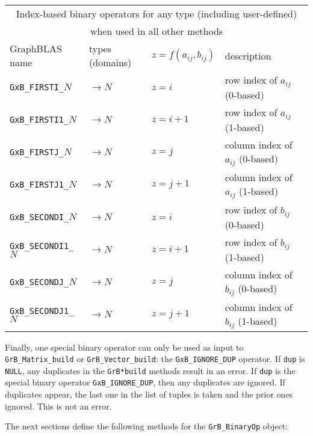 \documentclass[12pt]{article}
\begin{document}
\vspace{0.2in}
{\footnotesize
\begin{tabular}{|llll|}
\hline
\multicolumn{4}{|c|}{Index-based binary operators for any type (including user-defined)} \\
\multicolumn{4}{|c|}{when used in all other methods} \\
\hline
GraphBLAS name            & types (domains)   & $z=f(a_{ij},b_{ij})$      & description \\
\hline
\verb'GxB_FIRSTI_'$N$    & $ \rightarrow N$  & $z = i$       & row index of $a_{ij}$ (0-based) \\
\verb'GxB_FIRSTI1_'$N$   & $ \rightarrow N$  & $z = i+1$     & row index of $a_{ij}$ (1-based) \\
\verb'GxB_FIRSTJ_'$N$    & $ \rightarrow N$  & $z = j$       & column index of $a_{ij}$ (0-based) \\
\verb'GxB_FIRSTJ1_'$N$   & $ \rightarrow N$  & $z = j+1$     & column index of $a_{ij}$ (1-based) \\
\verb'GxB_SECONDI_'$N$   & $ \rightarrow N$  & $z = i$       & row index of $b_{ij}$ (0-based) \\
\verb'GxB_SECONDI1_'$N$  & $ \rightarrow N$  & $z = i+1$     & row index of $b_{ij}$ (1-based) \\
\verb'GxB_SECONDJ_'$N$   & $ \rightarrow N$  & $z = j$       & column index of $b_{ij}$ (0-based) \\
\verb'GxB_SECONDJ1_'$N$  & $ \rightarrow N$  & $z = j+1$     & column index of $b_{ij}$ (1-based) \\
\hline
\end{tabular}
}
\vspace{0.2in}

Finally, one special binary operator can only be used as input to
\verb'GrB_Matrix_build' or \verb'GrB_Vector_build': the \verb'GxB_IGNORE_DUP'
operator.  If \verb'dup' is \verb'NULL', any duplicates in the \verb'GrB*build'
methods result in an error.  If \verb'dup' is the special binary operator
\verb'GxB_IGNORE_DUP', then any duplicates are ignored.  If duplicates appear,
the last one in the list of tuples is taken and the prior ones ignored.  This
is not an error.

The next sections define the following methods for the \verb'GrB_BinaryOp'
object:
\end{document}
